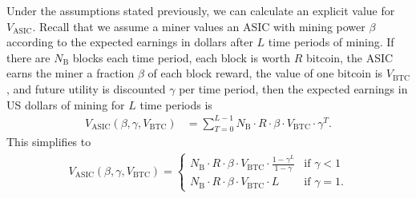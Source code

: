 \documentclass[12pt]{article}
\newcommand*{\Time}{T}
\newcommand*{\BlkReward}{{R}}
\newcommand*{\ExchgRate}{{V_{\mathrm{BTC}}}}
\newcommand*{\AsicValue}{{V_{\mathrm{ASIC}}}}
\newcommand*{\BlocksPerPeriod}{{N_{\mathrm{B}}}}
\begin{document}
Under the assumptions stated previously, we can calculate an explicit value for $\AsicValue$. Recall that we assume a miner values an ASIC with mining power $\beta$ according to the expected earnings in dollars after $L$ time periods of mining. %
If there are $\BlocksPerPeriod$ blocks each time period, each block is worth $\BlkReward$ bitcoin, the ASIC earns the miner a fraction $\beta$ of each block reward, the value of one bitcoin is $\ExchgRate$, and future utility is discounted $\gamma$ per time period, then the expected earnings in US dollars of mining for $L$ time periods is
\begin{align*}
  \AsicValue(\beta, \gamma, \ExchgRate)
  & =
  \sum_{\Time=0}^{L-1} \BlocksPerPeriod \cdot \BlkReward \cdot \beta \cdot \ExchgRate \cdot \gamma^T.
\end{align*}
This simplifies to
\begin{align*}
  \AsicValue(\beta, \gamma, \ExchgRate)
  = \begin{cases}
  \displaystyle
    \BlocksPerPeriod \cdot \BlkReward \cdot \beta \cdot \ExchgRate \cdot \frac{1 - \gamma^L}{1 - \gamma} & \text{if } \gamma < 1 \\
  \displaystyle
    \BlocksPerPeriod \cdot \BlkReward \cdot \beta \cdot \ExchgRate \cdot L & \text{if } \gamma = 1.
  \end{cases}
\end{align*}
\end{document}
